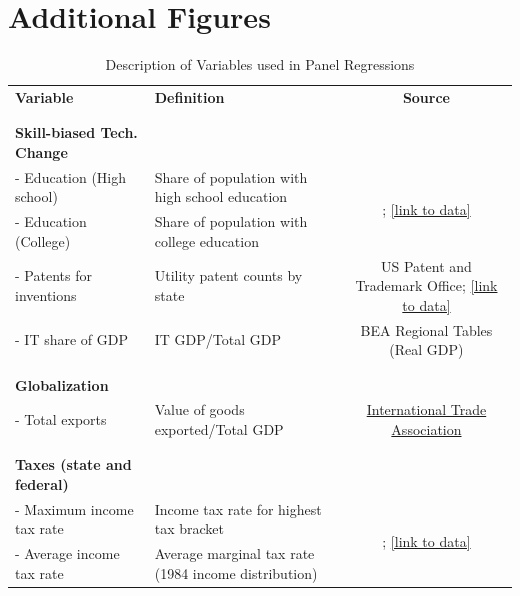 \documentclass[11pt]{article}
\theoremstyle{definition}
\numberwithin{equation}{section}
\begin{document}

\newpage\clearpage\appendix\onehalfspacing{} \setcounter{equation}{0} 
\section{Additional Figures}

\begin{landscape}
\begin{table}
\caption{Description of Variables used in Panel Regressions}
\label{ApdxTab_data_description}
\centering
\begin{tabular}{l|l|c}
 \hline  
 \hline	
	{\bf Variable} & {\bf Definition} & {\bf Source} \\ 
	&&\\ \hline 
	&&\\
	{\bf Skill-biased Tech. Change }	&& \\
	- Education (High school)  	& Share of population with high school education & \multirow{2}{*}{\cite{frank2009inequality}; \href{http://www.shsu.edu/eco_mwf/inequality.html}{[link to data]}}\\
	- Education (College)  	& Share of population with college education &\\
	 - Patents for inventions			& Utility patent counts by state 	&   US Patent and Trademark Office; \href{http://www.uspto.gov/web/offices/ac/ido/oeip/taf/cst_utlh.htm}{[link to data]} \\ 
	 - IT share of GDP					& IT GDP/Total GDP	 				&  BEA Regional Tables (Real GDP) \\ 
	&&\\ \hline 
	&&\\
	{\bf Globalization}  &&\\
	- Total exports &   	Value of goods exported/Total GDP								& \href{http://tse.export.gov/tse/tsehome.aspx}{International Trade Association} \\
	&&\\ \hline 
	&&\\
	{\bf Taxes (state and federal)}  & & \\
	- Maximum income tax rate & Income tax rate for highest tax bracket  	& \multirow{2}{*}{\cite{feenberg1993taxsim}; \href{http://users.nber.org/~taxsim/}{[link to data]}} \\
	- Average income tax rate & Average marginal tax rate (1984 income distribution) 	& \\

\end{tabular}
\end{table}
\end{landscape}
\end{document}
